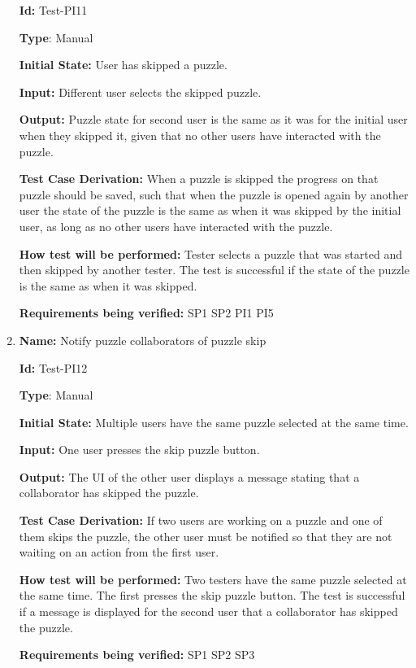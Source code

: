 \documentclass[12pt, titlepage]{article}
\begin{document}
\begin{enumerate}
\textbf{Id:} Test-PI11

\textbf{Type}: Manual

\textbf{Initial State:} User has skipped a puzzle.

\textbf{Input:} Different user selects the skipped puzzle.

\textbf{Output:} Puzzle state for second user is the same as it was for the initial user when they skipped it, given that no other users have interacted with the puzzle.

\textbf{Test Case Derivation:}
When a puzzle is skipped the progress on that puzzle should be saved, such that when the puzzle is opened again by another user the state of the puzzle is the same as when it was skipped by the initial user, as long as no other users have interacted with the puzzle.

\textbf{How test will be performed:}
Tester selects a puzzle that was started and then skipped by another tester. The test is successful if the state of the puzzle is the same as when it was skipped.

\textbf{Requirements being verified: } SP1 SP2 PI1 PI5

\item{\textbf{Name:} Notify puzzle collaborators of puzzle skip} \label{itm:Test-PI13}

\textbf{Id:} Test-PI12

\textbf{Type}: Manual

\textbf{Initial State:} Multiple users have the same puzzle selected at the same time.

\textbf{Input:} One user presses the skip puzzle button.

\textbf{Output:} The UI of the other user displays a message stating that a collaborator has skipped the puzzle.

\textbf{Test Case Derivation:}
If two users are working on a puzzle and one of them skips the puzzle, the other user must be notified so that they are not waiting on an action from the first user.

\textbf{How test will be performed:}
Two testers have the same puzzle selected at the same time. The first presses the skip puzzle button. The test is successful if a message is displayed for the second user that a collaborator has skipped the puzzle.

\textbf{Requirements being verified: } SP1 SP2 SP3

\end{enumerate}
\end{document}
